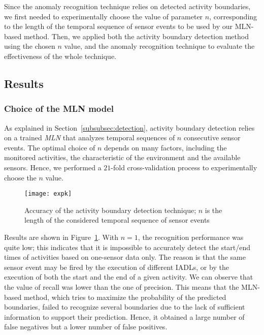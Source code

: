 \documentclass[10pt, conference, compsocconf]{IEEEtran}
\begin{document}
Since the anomaly recognition technique relies on detected activity boundaries,
we first needed to experimentally choose the value of parameter $n$, 
corresponding to the length of the temporal sequence of sensor events to be used by 
our MLN-based method.
Then, we applied both the activity boundary detection method using the chosen $n$ value, 
and the anomaly recognition technique to evaluate the effectiveness of the whole technique.


\subsection{Results}
\label{subsec:expres}




\subsubsection{Choice of the MLN model}
As explained in Section~\ref{subsubsec:detection}, activity boundary detection relies on a trained \emph{MLN} that analyzes temporal sequences of $n$ consecutive sensor events. 
The optimal choice of $n$ depends on many factors, including the monitored activities, the characteristic of the environment and the available sensors. Hence, we performed a $21$-fold cross-validation process to experimentally choose the $n$ value. 


\begin{figure}[t!]
  \centering
     \texttt{[image: expk]}
  \caption{Accuracy of the activity boundary detection technique; $n$ is the length of the considered temporal sequence of sensor events}
  \label{fig:plot-cv}
\end{figure}

Results are shown in Figure~\ref{fig:plot-cv}. With $n=1$, the recognition performance
was quite low; this indicates that it is impossible to accurately detect the start/end
times of activities based on one-sensor data only. The reason is that the same sensor event 
may be fired by the execution of different IADLs, or by the execution of both the
start and the end of a given activity. We can observe that the value of recall was lower
than the one of precision. This means that the MLN-based method, which tries to maximize the
probability of the predicted boundaries, failed to recognize several boundaries due to the
lack of sufficient information to support their prediction. Hence, it obtained a large
number of false negatives but a lower number of false positives.
\end{document}
